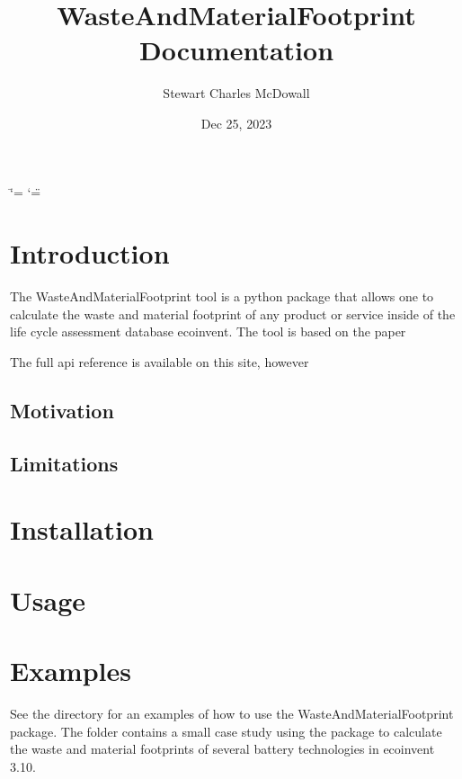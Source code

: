 \documentclass[letterpaper,10pt,english]{sphinxmanual}
\title{WasteAndMaterialFootprint Documentation}
\date{Dec 25, 2023}
\author{Stewart Charles McDowall}
\begin{document}
\ifdefined\shorthandoff
  \ifnum\catcode`\=\string=\active\shorthandoff{=}\fi
  \ifnum\catcode`\"=\active{}\fi
\fi

\pagestyle{empty}
\sphinxmaketitle
\pagestyle{plain}
\sphinxtableofcontents
\pagestyle{normal}
\label{\detokenize{index::doc}}


\sphinxstepscope


\chapter{Introduction}
\label{\detokenize{intro:introduction}}\label{\detokenize{intro::doc}}
\sphinxAtStartPar
The WasteAndMaterialFootprint tool is a python package that allows one to calculate the waste and material footprint of any product or service inside of the life cycle assessment database ecoinvent. The tool is based on the paper

\sphinxAtStartPar
{}

\sphinxAtStartPar
The full api reference is available on this site, however


\section{Motivation}
\label{\detokenize{intro:motivation}}

\section{Limitations}
\label{\detokenize{intro:limitations}}
\sphinxstepscope


\chapter{Installation}
\label{\detokenize{installation:installation}}\label{\detokenize{installation::doc}}
\sphinxstepscope


\chapter{Usage}
\label{\detokenize{usage:usage}}\label{\detokenize{usage::doc}}
\sphinxstepscope


\chapter{Examples}
\label{\detokenize{examples:examples}}\label{\detokenize{examples::doc}}
\sphinxAtStartPar
See the  directory for an examples of how to use the WasteAndMaterialFootprint package.
The folder  contains a small case study using the package to calculate the waste and material footprints of several battery technologies in ecoinvent 3.10.
\end{document}
